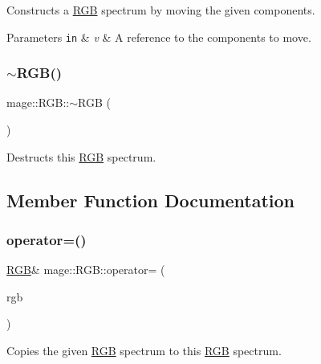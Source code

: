 Constructs a \hyperlink{structmage_1_1_r_g_b}{R\+GB} spectrum by moving the given components.


\begin{DoxyParams}[1]{Parameters}
\mbox{\tt in}  & {\em v} & A reference to the components to move. \\
\hline
\end{DoxyParams}
\hypertarget{structmage_1_1_r_g_b_a2c01428e1da4ec354b85320a905beab3}{}\label{structmage_1_1_r_g_b_a2c01428e1da4ec354b85320a905beab3} 
\subsubsection{\texorpdfstring{$\sim$\+R\+G\+B()}{~RGB()}}
{\footnotesize\ttfamily mage\+::\+R\+G\+B\+::$\sim$\+R\+GB (\begin{DoxyParamCaption}{ }\end{DoxyParamCaption})\hspace{0.3cm}{\ttfamily [default]}}

Destructs this \hyperlink{structmage_1_1_r_g_b}{R\+GB} spectrum. 

\subsection{Member Function Documentation}
\hypertarget{structmage_1_1_r_g_b_a904c9c27986975b015abcd9c0d4e137f}{}\label{structmage_1_1_r_g_b_a904c9c27986975b015abcd9c0d4e137f} 
\subsubsection{\texorpdfstring{operator=()}{operator=()}\hspace{0.1cm}{\footnotesize\ttfamily [1/2]}}
{\footnotesize\ttfamily \hyperlink{structmage_1_1_r_g_b}{R\+GB}\& mage\+::\+R\+G\+B\+::operator= (\begin{DoxyParamCaption}\item[{const \hyperlink{structmage_1_1_r_g_b}{R\+GB} \&}]{rgb }\end{DoxyParamCaption})\hspace{0.3cm}{\ttfamily [default]}}

Copies the given \hyperlink{structmage_1_1_r_g_b}{R\+GB} spectrum to this \hyperlink{structmage_1_1_r_g_b}{R\+GB} spectrum.


